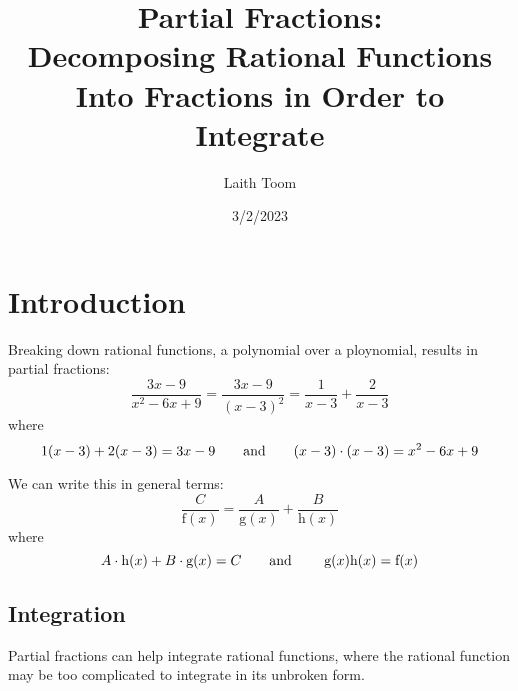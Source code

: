 \documentclass[12pt]{article}
\title{\textbf{Partial Fractions:}\\Decomposing Rational Functions Into Fractions in Order
to Integrate}
\author{Laith Toom}
\date{3/2/2023}
\begin{document}
\maketitle
\newpage
\tableofcontents
\newpage

\section{Introduction}
Breaking down rational functions, a polynomial over a ploynomial, results in partial fractions:
\[ \frac{3x-9}{x^2-6x+9} = \frac{3x-9}{(x-3)^2} = \frac{1}{x-3} + \frac{2}{x-3} \]
where
\[1(x-3) + 2(x-3) = 3x-9 \text{\qquad and\qquad} (x-3) \cdot (x-3) = x^2-6x+9 \]

\bigskip

\noindent We can write this in general terms:
\[ \frac{C}{\mathrm{f}(x)} = \frac{A}{\mathrm{g}(x)} + \frac{B}{\mathrm{h}(x)} \]
where 
\[ A\cdot\mathrm{h}(x) + B\cdot\mathrm{g}(x) = C \text{\qquad and \qquad} \mathrm{g}(x)\mathrm{h}(x) = \mathrm{f}(x) \]

\subsection{Integration}
Partial fractions can help integrate rational functions, where the rational function may
be too complicated to integrate in its unbroken form. 
\end{document}
